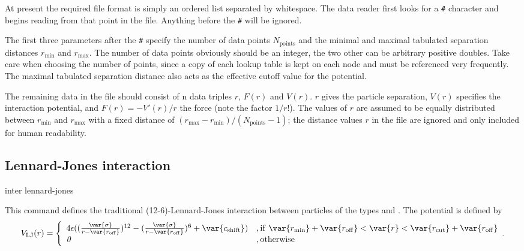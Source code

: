 At present the required file format is simply an ordered list separated by
whitespace. The data reader first looks for a \texttt{\#} character and begins
reading from that point in the file. Anything before the \texttt{\#} will be
ignored.

The first three parameters after the \texttt{\#} specify the number of data points
$N_\mathrm{points}$ and the minimal and maximal tabulated separation distances
$r_\mathrm{min}$ and $r_\mathrm{max}$. The number of data points obviously should
be an integer, the two other can be arbitrary positive doubles. Take care when
choosing the number of points, since a copy of each lookup table is kept on each
node and must be referenced very frequently. The maximal tabulated separation
distance also acts as the effective cutoff value for the potential.

The remaining data in the file should consist of n data triples $r$, $F(r)$ and
$V(r)$. $r$ gives the particle separation, $V(r)$ specifies the interaction
potential, and $F(r)= -V'(r)/r$ the force (note the factor $1/r$!). The values
of $r$ are assumed to be equally distributed between $r_\mathrm{min}$ and
$r_\mathrm{max}$ with a fixed distance of
$(r_\mathrm{max}-r_\mathrm{min})/(N_\mathrm{points}-1)$; the distance values $r$ in
the file are ignored and only included for human readability.

\subsection{Lennard-Jones interaction}
\label{sec:LennardJones}

\begin{essyntax}
  inter  
  lennard-jones 
  \var{\epsilon} \var{\sigma} 
  \begin{features}
  \end{features}
\end{essyntax}

This command defines the traditional (12-6)-Lennard-Jones interaction
between particles of the types  and .  The
potential is defined by
\begin{equation}
  \label{eq:lj}
  V_\mathrm{LJ}(r) = \Biggl\{
    \begin{array}{ll}
      4\epsilon((\frac{\var{\sigma}}{r-\var{r_\mathrm{off}}})^{12}
      - (\frac{\var{\sigma}}{r-\var{r_\mathrm{off}}})^6+\var{c_\mathrm{shift}}) 
      & \mathrm{, if~} \var{r_\mathrm{min}}+\var{r_\mathrm{off}} < \var{r} < \var{r_\mathrm{cut}}+\var{r_\mathrm{off}}\\
      \mathit{0} 
      & \mathrm{, otherwise}\\
    \end{array}.
\end{equation}

